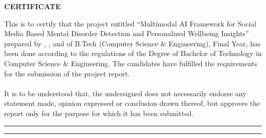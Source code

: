 \begin{center}
 \LARGE {\bf \uppercase{Certificate}}
\end{center}

\vspace{1\baselineskip}

\noindent
This is to certify that the project entitled “Multimodal AI Framework for Social Media Based Mental Disorder Detection and Personalized Wellbeing Insights” prepared by ,  ,  and  of B.Tech (Computer Science \& Engineering), Final Year, has been done according to the regulations of the Degree of
Bachelor of Technology in Computer Science \& Engineering. The candidates have
fulfilled the requirements for the submission of the project report.\\\\
It is to be understood that, the undersigned does not necessarily endorse any statement made, opinion expressed or conclusion drawn thereof, but approves the report only for the purpose for which it has been submitted.

\hspace{\baselineskip}

\vspace{3\baselineskip}
\begin{minipage}[c]{0.45\textwidth}
\centering
\hrule 
\vspace{0.5\baselineskip}
\end{minipage}
\hspace{1.0\baselineskip}
\begin{minipage}[c]{0.45\textwidth}
\centering
\hrule 
\vspace{0.5\baselineskip}
\end{minipage}
\vspace{\baselineskip}
\hspace{1.0\baselineskip}

